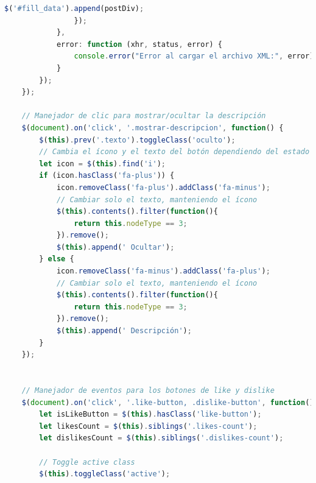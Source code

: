 \documentclass{article}
\begin{document}
\begin{lstlisting}[language=JavaScript, caption=Carga de los comentarios]
                    $('#fill_data').append(postDiv);
                });
            },
            error: function (xhr, status, error) {
                console.error("Error al cargar el archivo XML:", error);
            }
        });
    });

    // Manejador de clic para mostrar/ocultar la descripción
    $(document).on('click', '.mostrar-descripcion', function() {
        $(this).prev('.texto').toggleClass('oculto');
        // Cambia el ícono y el texto del botón dependiendo del estado
        let icon = $(this).find('i');
        if (icon.hasClass('fa-plus')) {
            icon.removeClass('fa-plus').addClass('fa-minus');
            // Cambiar solo el texto, manteniendo el ícono
            $(this).contents().filter(function(){
                return this.nodeType == 3;
            }).remove();
            $(this).append(' Ocultar');
        } else {
            icon.removeClass('fa-minus').addClass('fa-plus');
            // Cambiar solo el texto, manteniendo el ícono
            $(this).contents().filter(function(){
                return this.nodeType == 3;
            }).remove();
            $(this).append(' Descripción');
        }
    });


    // Manejador de eventos para los botones de like y dislike
    $(document).on('click', '.like-button, .dislike-button', function() {
        let isLikeButton = $(this).hasClass('like-button');
        let likesCount = $(this).siblings('.likes-count');
        let dislikesCount = $(this).siblings('.dislikes-count');

        // Toggle active class
        $(this).toggleClass('active');


\end{lstlisting}
\end{document}
